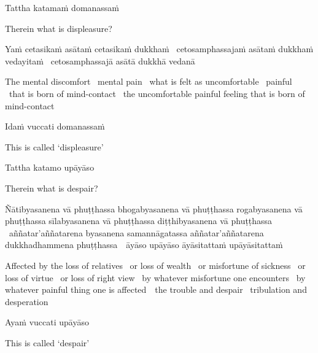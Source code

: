 Tattha katamaṁ domanassaṁ

\begin{english}
  Therein what is displeasure?
\end{english}

\begin{pali-hang}
  Yaṁ cetasikaṁ asātaṁ cetasikaṁ dukkhaṁ \breathmark\ cetosamphassajaṁ asātaṁ dukkhaṁ vedayitaṁ \breathmark\ cetosamphassajā asātā dukkhā vedanā
\end{pali-hang}

\begin{english-hang-verses}
  The mental discomfort \breathmark\ mental pain \breathmark\ what is felt as uncomfortable \breathmark\ painful \breathmark\ that is born of mind-contact \breathmark\ the uncomfortable painful feeling that is born of mind-contact
\end{english-hang-verses}

Idaṁ vuccati domanassaṁ

\begin{english}
  This is called `displeasure'
\end{english}

Tattha katamo upāyāso

\begin{english}
  Therein what is despair?
\end{english}

\begin{pali-hang}
  Ñātibyasanena vā phuṭṭhassa bhogabyasanena vā phuṭṭhassa rogabyasanena vā phuṭṭhassa sīlabyasanena vā phuṭṭhassa diṭṭhibyasanena vā phuṭṭhassa \breathmark\ aññatar'aññatarena byasanena samannāgatassa aññatar'aññatarena dukkhadhammena \mbox{phuṭṭhassa}~\breathmark\ āyāso upāyāso āyāsitattaṁ upāyāsitattaṁ
\end{pali-hang}

\begin{english-hang-verses}
  Affected by the loss of relatives \breathmark\ or loss of wealth \breathmark\ or misfortune of sickness \breathmark\ or loss of virtue \breathmark\ or loss of right view \breathmark\ by whatever misfortune one encounters \breathmark\ by whatever painful thing one is \mbox{affected}~\breathmark\ the trouble and despair \breathmark\ tribulation and desperation
\end{english-hang-verses}

Ayaṁ vuccati upāyāso

\begin{english}
  This is called `despair'
\end{english}

